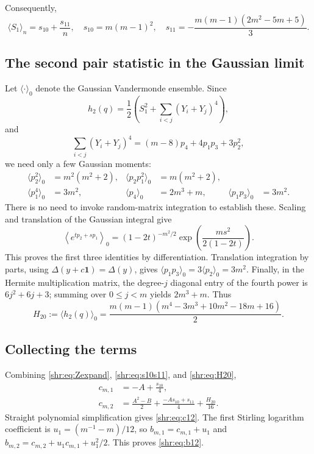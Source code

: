 \documentclass[11pt,letterpaper]{article}
\numberwithin{equation}{section}
\theoremstyle{definition}
\newcommand{\1}{\mathbf 1}
\begin{document}
Consequently,
\begin{equation}
 \langle S_1\rangle_n=s_{10}+\frac{s_{11}}n,
 \quad
 s_{10}=m(m-1)^2,\quad
 s_{11}=-\frac{m(m-1)(2m^2-5m+5)}3.
 \label{shr:eq:s10s11}
\end{equation}

\subsection{The second pair statistic in the Gaussian limit}
Let $\langle\cdot\rangle_0$ denote the Gaussian Vandermonde ensemble.
Since
\[
 h_2(q)=\frac12\left(S_1^2+\sum_{i<j}(Y_i+Y_j)^4\right),
\]
and
\[
 \sum_{i<j}(Y_i+Y_j)^4=(m-8)p_4+4p_1p_3+3p_2^2,
\]
we need only a few Gaussian moments:
\begin{align}
 \langle p_2^2\rangle_0&=m^2(m^2+2),&
 \langle p_2p_1^2\rangle_0&=m(m^2+2),\\
 \langle p_1^4\rangle_0&=3m^2,&
 \langle p_4\rangle_0&=2m^3+m,&
 \langle p_1p_3\rangle_0&=3m^2.
 \label{shr:eq:gaussmoments}
\end{align}
There is no need to invoke random-matrix integration to establish these.
Scaling and translation of the Gaussian integral give
\begin{equation}
 \left\langle e^{t p_2+s p_1}\right\rangle_0
 =(1-2t)^{-m^2/2}
 \exp\left(\frac{ms^2}{2(1-2t)}\right).
\end{equation}
This proves the first three identities by differentiation. Translation
integration by parts, using $\Delta(y+c\mathbf1)=\Delta(y)$, gives
$\langle p_1p_3\rangle_0=3\langle p_2\rangle_0=3m^2$.
Finally, in the Hermite multiplication matrix, the degree-$j$ diagonal
entry of the fourth power is $6j^2+6j+3$; summing over $0\le j<m$ yields
$2m^3+m$. Thus
\begin{equation}
 H_{20}:=\langle h_2(q)\rangle_0
 =\frac{m(m-1)(m^4-3m^3+10m^2-18m+16)}2.
 \label{shr:eq:H20}
\end{equation}

\subsection{Collecting the terms}
Combining \eqref{shr:eq:Zexpand}, \eqref{shr:eq:s10s11}, and \eqref{shr:eq:H20},
\begin{align}
 c_{m,1}&=-A+\frac{s_{10}}4,\\
 c_{m,2}&=\frac{A^2-B}{2}+
           \frac{-As_{10}+s_{11}}4+\frac{H_{20}}{16}.
\end{align}
Straight polynomial simplification gives \eqref{shr:eq:c12}.
The first Stirling logarithm coefficient is
$u_1=(m^{-1}-m)/12$, so
$b_{m,1}=c_{m,1}+u_1$ and
$b_{m,2}=c_{m,2}+u_1c_{m,1}+u_1^2/2$. This proves \eqref{shr:eq:b12}.
\end{document}
